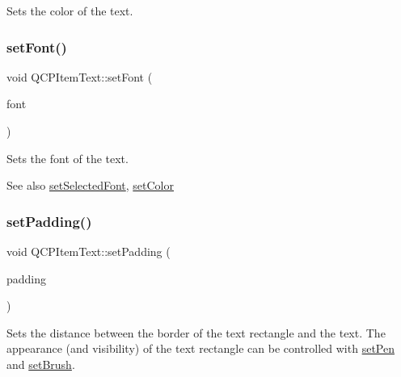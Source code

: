 Sets the color of the text. \mbox{\label{class_q_c_p_item_text_a94ad60ebe04f5c07c35e7c2029e96b1f}} 
\subsubsection{\texorpdfstring{set\+Font()}{setFont()}}
{\footnotesize\ttfamily void Q\+C\+P\+Item\+Text\+::set\+Font (\begin{DoxyParamCaption}\item[{const Q\+Font \&}]{font }\end{DoxyParamCaption})}

Sets the font of the text.

\begin{DoxySeeAlso}{See also}
\hyperlink{class_q_c_p_item_text_a0be2841772f83663c4db307928b82816}{set\+Selected\+Font}, \hyperlink{class_q_c_p_item_text_aa51efc0841fe52da9eaf8aff6fc8a8b2}{set\+Color} 
\end{DoxySeeAlso}
\mbox{\label{class_q_c_p_item_text_aeea8a3e01f135f9dd0bb08f51db66310}} 
\subsubsection{\texorpdfstring{set\+Padding()}{setPadding()}}
{\footnotesize\ttfamily void Q\+C\+P\+Item\+Text\+::set\+Padding (\begin{DoxyParamCaption}\item[{const Q\+Margins \&}]{padding }\end{DoxyParamCaption})}

Sets the distance between the border of the text rectangle and the text. The appearance (and visibility) of the text rectangle can be controlled with \hyperlink{class_q_c_p_item_text_a9b9ec6eea0eb0603977ff84d4c78d0a3}{set\+Pen} and \hyperlink{class_q_c_p_item_text_a1c7e131516df2ed8d941ef31240ded8e}{set\+Brush}. \mbox{\label{class_q_c_p_item_text_a9b9ec6eea0eb0603977ff84d4c78d0a3}} 
